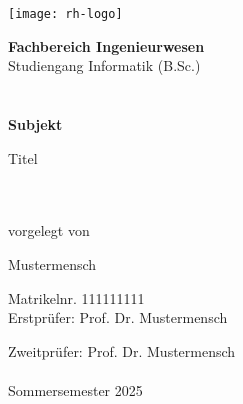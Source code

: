 \begin{titlepage}
    \thispagestyle{empty}
    \hspace{-1cm}\texttt{[image: rh-logo]}\\[1.9cm]
    
    \vspace{2cm}
    \begin{minipage}{\textwidth}
    \hspace{2.5cm}\begin{minipage}{\dimexpr\textwidth-2.5cm\relax}
    {\Large\textbf{Fachbereich Ingenieurwesen}}\\
    
    {\Large Studiengang Informatik (B.Sc.)}\\
    \\
    \\
    
    
    {\Large\textbf{Subjekt}}
    
    \parbox{\textwidth}{\Large\raggedright Titel}\\
    \\
    
    {\normalsize\fontsize{11pt}{16.5pt}\selectfont vorgelegt von}
    
    {\Large Mustermensch}
    
    {\normalsize\fontsize{11pt}{16.5pt}\selectfont Matrikelnr. 111111111}\\


    {\normalsize\fontsize{11pt}{16.5pt}\selectfont Erstprüfer: Prof. Dr. Mustermensch}

    {\normalsize\fontsize{11pt}{16.5pt}\selectfont Zweitprüfer: Prof. Dr. Mustermensch}\\
    \\
    
    {\normalsize Sommersemester 2025}
    \end{minipage}
    \end{minipage}
    
    \vfill
    
\end{titlepage}
